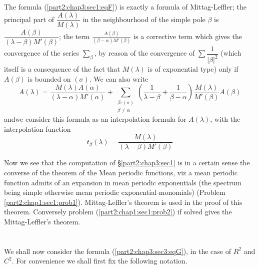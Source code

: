 \setcounter{rem}{1}
\begin{rem}\label{part2:chap3:sec4:rem2}%
  The formula (\ref{part2:chap3:sec1:eqF}) is exactly a formula of Mittag-Leffler;
  the principal part of $\dfrac{A(\lambda )}{M(\lambda )}$ in the
  neighbourhood of the simple pole $\beta $ is $\dfrac{A(\beta
    )}{(\lambda - \beta ) M'(\beta )}$; the term $\frac{A (\beta
    )}{(\beta - \alpha) M' (\beta )}$ is a corrective term which gives
  the convergence of the series $\sum\limits_{\beta}$, by reason of
  the convergence of $\sum \dfrac{1}{| \beta |^2}$ (which itself is a
  consequence of the fact that $M (\lambda )$ is of exponential type)
  only if $A (\beta )$ is bounded on $(\sigma)$. We can also write 
  $$
  A (\lambda ) = \frac{M(\lambda ) A (\alpha )}{(\lambda - \alpha)
    M'(\alpha )} + \sum_{\substack{\beta \varepsilon  (\sigma) \\ \beta \neq
      \alpha}} \left(\frac{1}{\lambda - \beta} + \frac{1}{\beta - \alpha}\right)
  \frac{M(\lambda )}{M' (\beta)} A (\beta) 
  $$
  and\pageoriginale we consider this formula as an interpolation formula for
  $A(\lambda)$, with the interpolation function 
  $$
  t_\beta (\lambda ) = \frac{M(\lambda )}{(\lambda - \beta) M' (\beta )}
  $$
\end{rem}

Now we see that the computation of \S \ref{part2:chap3:sec1} is in a certain sense the
converse of the theorem of the Mean periodic functions, viz a mean
periodic function admits of an expansion in mean periodic exponentials
(the spectrum being simple otherwise mean periodic
exponential-monomials) (Problem \ref{part2:chap1:sec1:prob1}). Mittag-Leffler's theorem is used
in the proof of this theorem. Conversely problem
(\ref{part2:chap1:sec1:prob2}) if solved gives
the Mittag-Leffler's theorem. 

\section{}\label{part2:chap3:sec5}

We shall now consider the formula (\ref{part2:chap3:sec3:eqG}), in the
case of $R^2$ 
and $C^2$. For convenience we shall first fix the following notation. 

